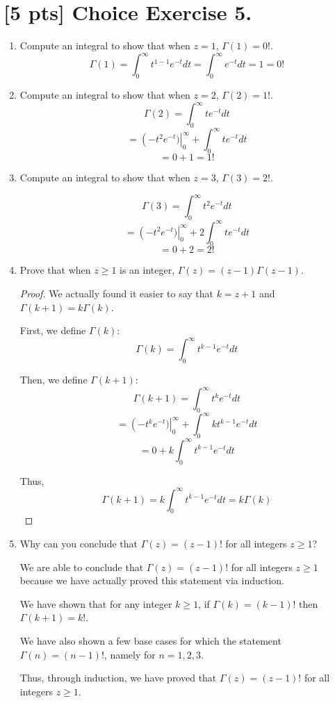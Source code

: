 \documentclass{article}
\begin{document}
\section*{[5 pts] Choice Exercise 5.}

\begin{enumerate}
    \item {
        Compute an integral to show that when \(z=1\), \(\Gamma(1) = 0!\).
        \[\Gamma(1) = \int_0^\infty{t^{1-1}e^{-t}} dt = \int_0^\infty{e^{-t}} dt = 1 = 0!\]
    }

    \item {
        Compute an integral to show that when \(z=2\), \(\Gamma(2)=1!\).
        \[\Gamma(2) = \int_0^\infty{te^{-t}} dt\]
        \[ = \left (-t^2 e^{-t}) \right|_0^\infty + \int_{0}^{\infty}{t e^{-t}} dt\]
        \[ = 0 + 1 = 1!\]
    }

    \item {
        Compute an integral to show that when \(z=3\), \(\Gamma(3)=2!\).

        \[ \Gamma(3) = \int_0^\infty{t^2e^{-t}} dt\]
        \[ = \left (-t^2e^{-t}) \right|_0^\infty + 2\int_{0}^{\infty}{te^{-t}} dt\]
        \[ = 0 + 2 = 2!\]
    }

    \item {
        Prove that when \(z \ge 1\) is an integer, \(\Gamma(z) = (z-1)\Gamma(z-1)\).

        \begin{proof}
            We actually found it easier to say that \(k = z+1\) and \(\Gamma(k+1) = k\Gamma(k)\).

            First, we define \(\Gamma(k)\):
            \[ \Gamma(k) = \int_{0}^{\infty}{t^{k-1}e^{-t}} dt\]

            Then, we define \(\Gamma(k+1)\):
            \[ \Gamma(k+1) = \int_{0}^{\infty}{t^ke^{-t}} dt\]
            \[ = \left (-t^ke^{-t}) \right|_0^\infty + \int_{0}^{\infty}{kt^{k-1}e^{-t}} dt\]
            \[ = 0 + k \int_{0}^{\infty}{t^{k-1}e^{-t}} dt\]

            Thus,
            \[ \Gamma(k+1) = k \int_{0}^{\infty}{t^{k-1}e^{-t}} dt = k\Gamma(k)\]
        \end{proof}
    }

    \item {
        Why can you conclude that \(\Gamma(z) = (z-1)!\) for all integers \(z \ge 1\)?

        We are able to conclude that \(\Gamma(z) = (z-1)!\) for all integers \(z \ge 1\)
        because we have actually proved this statement via induction.

        We have shown that for any integer \(k \ge 1\), if \(\Gamma(k) = (k-1)!\)
        then \(\Gamma(k+1) = k!\).

        We have also shown a few base cases for which the statement \(\Gamma(n) = (n-1)!\),
        namely for \(n = 1, 2, 3\).

        Thus, through induction, we have proved that \(\Gamma(z) = (z-1)!\) for all integers \(z \ge 1\).
    }
\end{enumerate}
\end{document}
